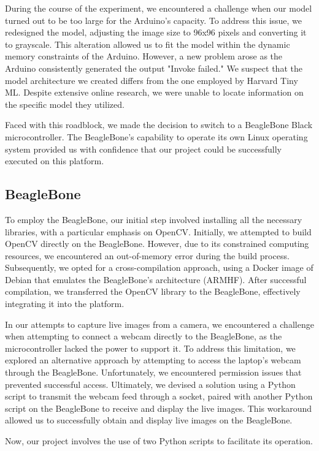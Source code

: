 \documentclass[journal,article,submit,pdftex,moreauthors]{Definitions/mdpi}
\begin{document}
During the course of the experiment, we encountered a challenge when our model turned out to be too large for the Arduino's capacity. To address this issue, we redesigned the model, adjusting the image size to 96x96 pixels and converting it to grayscale. This alteration allowed us to fit the model within the dynamic memory constraints of the Arduino. However, a new problem arose as the Arduino consistently generated the output "Invoke failed." We suspect that the model architecture we created differs from the one employed by Harvard Tiny ML. Despite extensive online research, we were unable to locate information on the specific model they utilized.

Faced with this roadblock, we made the decision to switch to a BeagleBone Black microcontroller. The BeagleBone's capability to operate its own Linux operating system provided us with confidence that our project could be successfully executed on this platform.

\subsection{BeagleBone}
To employ the BeagleBone, our initial step involved installing all the necessary libraries, with a particular emphasis on OpenCV. Initially, we attempted to build OpenCV directly on the BeagleBone. However, due to its constrained computing resources, we encountered an out-of-memory error during the build process. Subsequently, we opted for a cross-compilation approach, using a Docker image of Debian that emulates the BeagleBone's architecture (ARMHF). After successful compilation, we transferred the OpenCV library to the BeagleBone, effectively integrating it into the platform.

In our attempts to capture live images from a camera, we encountered a challenge when attempting to connect a webcam directly to the BeagleBone, as the microcontroller lacked the power to support it. To address this limitation, we explored an alternative approach by attempting to access the laptop's webcam through the BeagleBone. Unfortunately, we encountered permission issues that prevented successful access. Ultimately, we devised a solution using a Python script to transmit the webcam feed through a socket, paired with another Python script on the BeagleBone to receive and display the live images. This workaround allowed us to successfully obtain and display live images on the BeagleBone.

Now, our project involves the use of two Python scripts to facilitate its operation.
\end{document}
